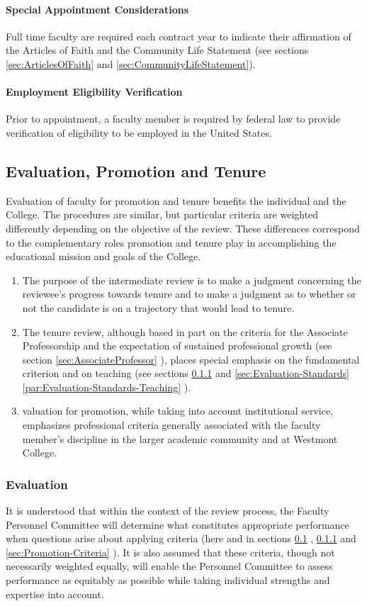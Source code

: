 			\paragraph{Special Appointment Considerations}
				Full time faculty are required each contract year to indicate their affirmation of the Articles of Faith and the Community Life Statement (see
				sections
				\ref{sec:ArticlesOfFaith}
				and
				\ref{sec:CommunityLifeStatement}).
			\paragraph{Employment Eligibility Verification}
				Prior to appointment, a faculty member is required by federal law to provide verification of eligibility to be employed in the United States.
	\subsection{Evaluation, Promotion and Tenure}
		\label{sec:EvaluationPromotionAndTenure}
		Evaluation of faculty for promotion and tenure benefits the individual and the College. The procedures are similar, but particular criteria are weighted differently depending on the objective of the review.  These differences correspond to the complementary roles promotion and tenure play in accomplishing the educational mission and goals of the College.
		\begin{enumerate}
			\item{The purpose of the intermediate review is to make a judgment
				concerning the reviewee's progress towards tenure and to make a judgment
				as to whether or not the candidate is on a trajectory that would lead to
				tenure.}
			\item{The tenure review, although based in part on the criteria for the
				Associate Professorship and the expectation of sustained professional
				growth (see section
				\ref{sec:AssociateProfessor}
				), places special emphasis on the
				fundamental criterion and on teaching (see
				sections
				\ref{sec:Evaluation}
				and
				\ref{sec:Evaluation-Standards}
				\ref{par:Evaluation-Standards-Teaching}
				).
			}
			\item{ valuation for promotion, while taking into account institutional
				service, emphasizes professional criteria generally associated with the
				faculty member's discipline in the larger academic community and at
				Westmont College.}
		\end{enumerate}
		\subsubsection{Evaluation}
			\label{sec:Evaluation}
			It is understood that within the context of the review process, the Faculty Personnel Committee will determine what constitutes appropriate performance when questions arise about applying criteria (here and in sections
			\ref{sec:EvaluationPromotionAndTenure}
			,
			\ref{sec:Evaluation}
			and
			\ref{sec:Promotion-Criteria}
			).  It is also assumed that these criteria, though not necessarily weighted equally, will enable the Personnel Committee to assess performance as equitably as possible while taking individual strengths and expertise into account.

